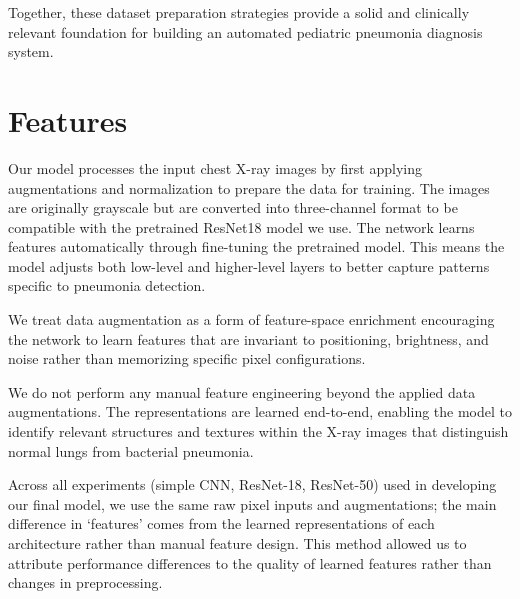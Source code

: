 \documentclass[11pt]{article}
\begin{document}
Together, these dataset preparation strategies provide a solid and clinically relevant foundation for building an automated pediatric pneumonia diagnosis system.



\section{Features}


Our model processes the input chest X-ray images by first applying augmentations and normalization to prepare the data for training. The images are originally grayscale but are converted into three-channel format to be compatible with the pretrained ResNet18 model we use. 
The network learns features automatically through fine-tuning the pretrained model. This means the model adjusts both low-level and higher-level layers to better capture patterns specific to pneumonia detection.

We treat data augmentation as a form of feature-space enrichment encouraging the network to learn features that are invariant to positioning, brightness, and noise rather than memorizing specific pixel configurations.

We do not perform any manual feature engineering beyond the 
applied data augmentations. The representations are learned end-to-end, enabling the model to identify relevant structures and textures within the X-ray images that distinguish normal lungs from bacterial pneumonia.

Across all experiments (simple CNN, ResNet-18, ResNet-50) used in developing our final model, we use the same raw pixel inputs and augmentations; the main difference in ‘features’ comes from the learned representations of each architecture rather than manual feature design. This method allowed us to attribute performance differences to the quality of learned features rather than changes in preprocessing.



\end{document}
